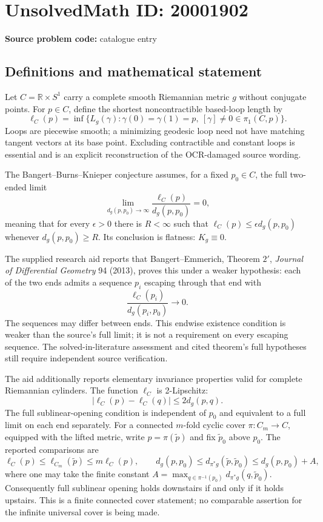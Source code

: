 \documentclass[11pt]{article}
\newcommand{\R}{\mathbb{R}}
\begin{document}
\section*{UnsolvedMath ID: 20001902}
\textbf{Source problem code:} catalogue entry
\subsection{Definitions and mathematical statement}
Let \(C=\R\times S^1\) carry a complete smooth Riemannian metric \(g\) without conjugate points. For \(p\in C\), define the shortest noncontractible based-loop length by
\[
\ell_C(p)=\inf\{L_g(\gamma):\gamma(0)=\gamma(1)=p,\ [\gamma]\ne0\in\pi_1(C,p)\}.
\]
Loops are piecewise smooth; a minimizing geodesic loop need not have matching tangent vectors at its base point. Excluding contractible and constant loops is essential and is an explicit reconstruction of the OCR-damaged source wording.

The Bangert--Burns--Knieper conjecture assumes, for a fixed \(p_0\in C\), the full two-ended limit
\[
\lim_{d_g(p,p_0)\to\infty}\frac{\ell_C(p)}{d_g(p,p_0)}=0,
\]
meaning that for every \(\epsilon>0\) there is \(R<\infty\) such that \(\ell_C(p)\leq\epsilon d_g(p,p_0)\) whenever \(d_g(p,p_0)\geq R\). Its conclusion is flatness: \(K_g\equiv0\).

The supplied research aid reports that Bangert--Emmerich, Theorem \(2'\), \emph{Journal of Differential Geometry} 94 (2013), proves this under a weaker hypothesis: each of the two ends admits a sequence \(p_i\) escaping through that end with
\[
\frac{\ell_C(p_i)}{d_g(p_i,p_0)}\longrightarrow0.
\]
The sequences may differ between ends. This endwise existence condition is weaker than the source's full limit; it is not a requirement on every escaping sequence. The solved-in-literature assessment and cited theorem's full hypotheses still require independent source verification.

The aid additionally reports elementary invariance properties valid for complete Riemannian cylinders. The function \(\ell_C\) is 2-Lipschitz:
\[
|\ell_C(p)-\ell_C(q)|\leq2d_g(p,q).
\]
The full sublinear-opening condition is independent of \(p_0\) and equivalent to a full limit on each end separately. For a connected \(m\)-fold cyclic cover \(\pi:C_m\to C\), equipped with the lifted metric, write \(p=\pi(\widetilde p)\) and fix \(\widetilde p_0\) above \(p_0\). The reported comparisons are
\[
\ell_C(p)\leq\ell_{C_m}(\widetilde p)\leq m\ell_C(p),
\qquad
d_g(p,p_0)\leq d_{\pi^*g}(\widetilde p,\widetilde p_0)
\leq d_g(p,p_0)+A,
\]
where one may take the finite constant
\(A=\max_{q\in\pi^{-1}(p_0)}d_{\pi^*g}(q,\widetilde p_0)\).
Consequently full sublinear opening holds downstairs if and only if it holds upstairs. This is a finite connected cover statement; no comparable assertion for the infinite universal cover is being made.
\end{document}
